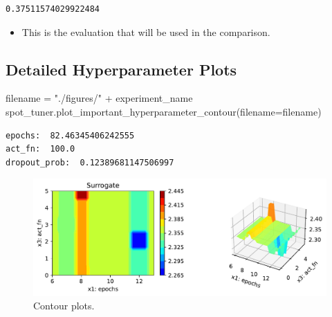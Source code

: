 \documentclass[
  letterpaper,
  DIV=11,
  numbers=noendperiod]{scrreprt}
\newenvironment{Shaded}{\begin{snugshade}}{\end{snugshade}}
\newcommand{\NormalTok}[1]{\textcolor[rgb]{0.00,0.23,0.31}{#1}}
\newcommand{\OperatorTok}[1]{\textcolor[rgb]{0.37,0.37,0.37}{#1}}
\newcommand{\StringTok}[1]{\textcolor[rgb]{0.13,0.47,0.30}{#1}}
\providecommand{\tightlist}{%
  \setlength{\itemsep}{0pt}\setlength{\parskip}{0pt}}\usepackage{longtable,booktabs,array}
\begin{document}
\begin{verbatim}
0.37511574029922484
\end{verbatim}

\begin{tcolorbox}[enhanced jigsaw, titlerule=0mm, colbacktitle=quarto-callout-note-color!10!white, coltitle=black, arc=.35mm, toptitle=1mm, colback=white, left=2mm, opacityback=0, bottomtitle=1mm, bottomrule=.15mm, breakable, opacitybacktitle=0.6, colframe=quarto-callout-note-color-frame, rightrule=.15mm, toprule=.15mm, leftrule=.75mm, title=\textcolor{quarto-callout-note-color}{\faInfo}\hspace{0.5em}{Note: Evaluation for the Final Comaprison}]

\begin{itemize}
\tightlist
\item
  This is the evaluation that will be used in the comparison.
\end{itemize}

\end{tcolorbox}

\hypertarget{detailed-hyperparameter-plots-7}{%
\subsection{Detailed Hyperparameter
Plots}\label{detailed-hyperparameter-plots-7}}

\begin{Shaded}
\begin{Highlighting}[]
\NormalTok{filename }\OperatorTok{=} \StringTok{"./figures/"} \OperatorTok{+}\NormalTok{ experiment\_name}
\NormalTok{spot\_tuner.plot\_important\_hyperparameter\_contour(filename}\OperatorTok{=}\NormalTok{filename)}
\end{Highlighting}
\end{Shaded}

\begin{verbatim}
epochs:  82.46345406242555
act_fn:  100.0
dropout_prob:  0.12389681147506997
\end{verbatim}

\begin{figure}[H]

{\centering \includegraphics{31_spot_lightning_csv_files/figure-pdf/cell-20-output-2.pdf}

}

\caption{Contour plots.}

\end{figure}
\end{document}
